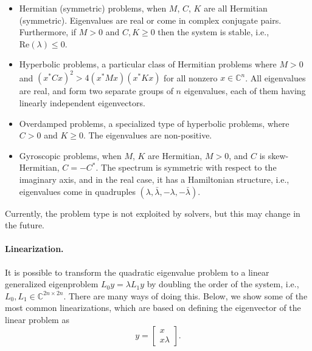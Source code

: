 \begin{itemize}
\item Hermitian (symmetric) problems, when $M$, $C$, $K$ are all Hermitian (symmetric). Eigenvalues are real or come in complex conjugate pairs. Furthermore, if $M>0$ and $C,K\geq 0$ then the system is stable, i.e., $\text{Re}(\lambda)\leq 0$.
\item Hyperbolic problems, a particular class of Hermitian problems where $M>0$ and $(x^*Cx)^2>4(x^*Mx)(x^*Kx)$ for all nonzero $x\in\mathbb{C}^n$. All eigenvalues are real, and form two separate groups of $n$ eigenvalues, each of them having linearly independent eigenvectors.
\item Overdamped problems, a specialized type of hyperbolic problems, where $C>0$ and $K\geq 0$. The eigenvalues are non-positive.
\item Gyroscopic problems, when $M$, $K$ are Hermitian, $M>0$, and $C$ is skew-Hermitian, $C=-C^*$. The spectrum is symmetric with respect to the imaginary axis, and in the real case, it has a Hamiltonian structure, i.e., eigenvalues come in quadruples $(\lambda,\bar{\lambda},-\lambda,-\bar{\lambda})$.
\end{itemize}

Currently, the problem type is not exploited by  solvers, but this may change in the future.

\paragraph{Linearization.}

It is possible to transform the quadratic eigenvalue problem to a linear generalized eigenproblem $L_0y=\lambda L_1y$ by doubling the order of the system, i.e., $L_0,L_1\in\mathbb{C}^{2n\times 2n}$. There are many ways of doing this. 
Below, we show some of the most common linearizations,
which are based on defining the eigenvector of the linear problem as 
\begin{equation}
\label{eq:linevec}
y=\left[\begin{array}{c}x\\x\lambda\end{array}\right].
\end{equation}

